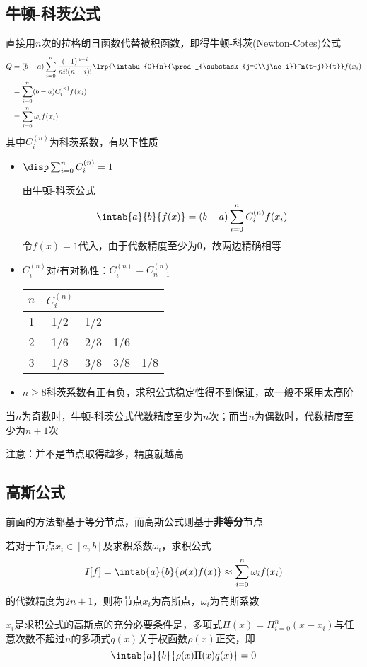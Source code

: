 \subsection{牛顿-科茨公式}
直接用$n$次的拉格朗日函数代替被积函数，即得牛顿-科茨(Newton-Cotes)公式
\[\begin{aligned}
    Q&=(b-a)\sum_{i=0}^n\frac{(-1)^{n-i}}{ni!(n-i)!}\lrp{\intabu{0}{n}{\prod_{\substack{j=0\\j\ne i}}^n(t-j)}{t}}f(x_i)\\
    &=\sum_{i=0}^n(b-a)C_i^{(n)} f(x_i)\\
    &=\sum_{i=0}^n\omega_if(x_i)
\end{aligned}\]
其中$C_i^{(n)}$为科茨系数，有以下性质
\begin{itemize}
    \item $\disp\sum_{i=0}^nC_{i}^{(n)}=1$
    \begin{analysis}
        由牛顿-科茨公式
        \[\intab{a}{b}{f(x)}=(b-a)\sum_{i=0}^nC_i^{(n)}f(x_i)\]
        令$f(x)=1$代入，由于代数精度至少为$0$，故两边精确相等
    \end{analysis}
    \item $C_i^{(n)}$对$i$有对称性：$C_i^{(n)}=C_{n-1}^{(n)}$
\begin{center}
\begin{tabular}{c|cccc}\hline
$n$ & $C_i^{(n)}$\\\hline
1 & 1/2 & 1/2 \\\hline
2 & 1/6 & 2/3 & 1/6\\\hline
3 & 1/8 & 3/8 & 3/8 & 1/8\\\hline
\end{tabular}
\end{center}
    \item $n\geq 8$科茨系数有正有负，求积公式稳定性得不到保证，故一般不采用太高阶
\end{itemize}
\begin{theorem}
    当$n$为奇数时，牛顿-科茨公式代数精度至少为$n$次；而当$n$为偶数时，代数精度至少为$n+1$次
\end{theorem}
注意：并不是节点取得越多，精度就越高

\subsection{高斯公式}
前面的方法都基于等分节点，而高斯公式则基于\textbf{非等分}节点
\begin{definition}
    若对于节点$x_i\in[a,b]$及求积系数$\omega_i$，求积公式
    \[I[f]=\intab{a}{b}{\rho(x)f(x)}\approx\sum_{i=0}^n\omega_if(x_i)\]
    的代数精度为$2n+1$，则称节点$x_i$为高斯点，$\omega_i$为高斯系数
\end{definition}
\begin{theorem}
    $x_i$是求积公式的高斯点的充分必要条件是，多项式$\Pi(x)=\Pi_{i=0}^n(x-x_i)$与任意次数不超过$n$的多项式$q(x)$关于权函数$\rho(x)$正交，即
    \[\intab{a}{b}{\rho(x)\Pi(x)q(x)}=0\]
\end{theorem}

